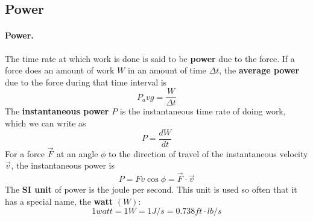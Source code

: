 \documentclass{article}
\begin{document}
\subsection{Power}
\paragraph{Power.}The time rate at which work is done is said to be \textbf{power} due to the force. If a force does an amount of work $W$ in an amount of time $\Delta t$, the \textbf{average power} due to the force during that time interval is
\begin{equation}
    P_avg = \frac{W}{\Delta t}
\end{equation}
The \textbf{instantaneous power} $P$ is the instantaneous time rate of doing work, which we can write as
\begin{equation}
    P = \frac{dW}{dt}
\end{equation}
For a force $\vec{F}^{}$ at an angle $\phi$ to the direction of travel of the instantaneous velocity $\vec{v}^{}$, the instantaneous power is
\begin{equation}
    P = Fv\cos \phi = \vec{F}^{} \cdot \vec{v}^{}
\end{equation}
The \textbf{SI unit} of power is the joule per second. This unit is used so often that it has a special name, the \textbf{watt} $(W)$:\\
\begin{equation}
    1 watt = 1 W = 1 J/s = 0.738 ft \cdot lb/s
\end{equation}
\end{document}
